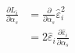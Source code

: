 \documentclass[10pt]{article}
\begin{document}
\begin{align*}\begin{split}
\frac{\partial L_i}{\partial \alpha_s} &= \frac{\partial}{\partial \alpha_s} \hat{\varepsilon}_i^2 \\
&= 2 \hat{\varepsilon}_i \frac{\partial \hat{\varepsilon}_i}{\partial \alpha_s} \\
\end{split}\end{align*}
\end{document}
